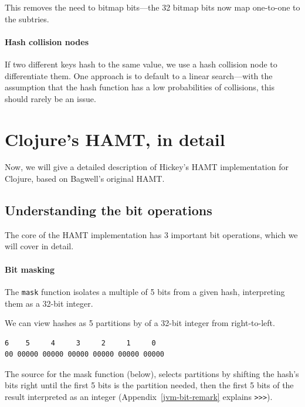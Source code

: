 \documentclass[preprint]{sigplanconf}
\begin{document}
This removes the need to bitmap bits---the
32 bitmap bits now map one-to-one to the subtries.

\paragraph{Hash collision nodes}
If two different keys hash to the same value,
we use a hash collision node
to differentiate them. One approach
is to default to a linear search---with
the assumption that the hash function
has a low probabilities of collisions,
this should rarely be an issue.


\section{Clojure's HAMT, in detail}
\label{clojure-hamt}

Now, we will give a detailed description of
Hickey's HAMT implementation for Clojure, based
on Bagwell's original HAMT.

\subsection{Understanding the bit operations}

The core of the HAMT implementation has 3 important
bit operations, which we will cover in detail.

\paragraph{Bit masking}

The \texttt{mask} function isolates a multiple of
5 bits from a given hash, interpreting them as
a 32-bit integer.

We can view hashes as 5 partitions
by of a 32-bit integer from right-to-left.

\begin{verbatim}
6    5     4     3     2     1     0
00 00000 00000 00000 00000 00000 00000
\end{verbatim}

The source for the mask function (below),
selects partitions
by
shifting the hash's bits right until the first
5 bits is the partition needed, then the 
first 5 bits of the result
interpreted as an integer
(Appendix~\ref{jvm-bit-remark} explains \texttt{>>>}).
\end{document}
